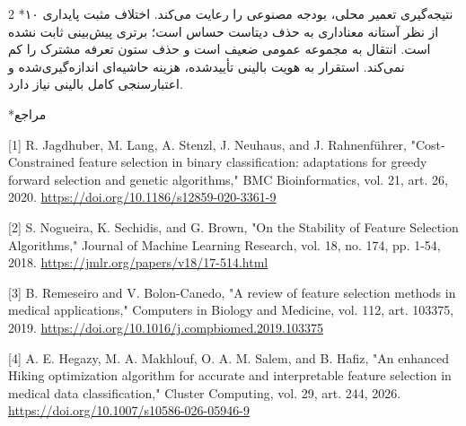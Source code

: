 \documentclass[10pt,a4paper]{article}
\makeatletter
\renewcommand{\section}{\@startsection{section}{1}{0pt}{5pt}{2pt}{\normalfont\normalsize\bfseries}}
\newcommand{\sect}[1]{\section*{#1}}
\makeatother
\begin{document}
\begin{multicols}{2}
\sect{۱۰  نتیجه‌گیری}
تعمیر محلی، بودجه مصنوعی را رعایت می‌کند. اختلاف مثبت پایداری از نظر آستانه معناداری به حذف دیتاست حساس است؛ برتری پیش‌بینی ثابت نشده است. انتقال به مجموعه عمومی ضعیف است و حذف ستون تعرفه مشترک را کم نمی‌کند. استقرار به هویت بالینی تأییدشده، هزینه حاشیه‌ای اندازه‌گیری‌شده و اعتبارسنجی کامل بالینی نیاز دارد.

\sect{مراجع}
\begin{minipage}{\linewidth}{\fontsize{7}{8.2}\selectfont \begin{latin}[1] R. Jagdhuber, M. Lang, A. Stenzl, J. Neuhaus, and J. Rahnenführer, "Cost-Constrained feature selection in binary classification: adaptations for greedy forward selection and genetic algorithms," BMC Bioinformatics, vol. 21, art. 26, 2020. \url{https://doi.org/10.1186/s12859-020-3361-9}\end{latin}\par}\end{minipage}\par
\begin{minipage}{\linewidth}{\fontsize{7}{8.2}\selectfont \begin{latin}[2] S. Nogueira, K. Sechidis, and G. Brown, "On the Stability of Feature Selection Algorithms," Journal of Machine Learning Research, vol. 18, no. 174, pp. 1-54, 2018. \url{https://jmlr.org/papers/v18/17-514.html}\end{latin}\par}\end{minipage}\par
\begin{minipage}{\linewidth}{\fontsize{7}{8.2}\selectfont \begin{latin}[3] B. Remeseiro and V. Bolon-Canedo, "A review of feature selection methods in medical applications," Computers in Biology and Medicine, vol. 112, art. 103375, 2019. \url{https://doi.org/10.1016/j.compbiomed.2019.103375}\end{latin}\par}\end{minipage}\par
\begin{minipage}{\linewidth}{\fontsize{7}{8.2}\selectfont \begin{latin}[4] A. E. Hegazy, M. A. Makhlouf, O. A. M. Salem, and B. Hafiz, "An enhanced Hiking optimization algorithm for accurate and interpretable feature selection in medical data classification," Cluster Computing, vol. 29, art. 244, 2026. \url{https://doi.org/10.1007/s10586-026-05946-9}\end{latin}\par}\end{minipage}\par

\end{multicols}
\end{document}
